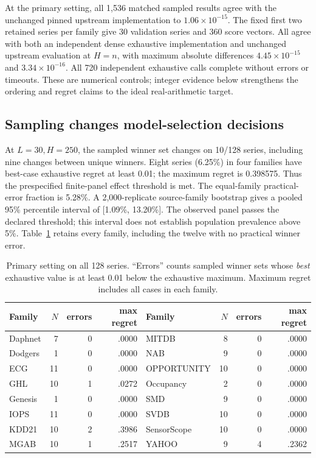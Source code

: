 At the primary setting, all 1,536 matched sampled results agree with the
unchanged pinned upstream implementation to $1.06\times10^{-15}$.
The fixed first two retained series per family give 30 validation series
and 360 score vectors. All agree with both an independent dense exhaustive
implementation and unchanged upstream evaluation at $H=n$, with maximum
absolute differences $4.45\times10^{-15}$ and $3.34\times10^{-16}$.
All 720 independent exhaustive calls complete without errors or timeouts.
These are numerical controls; integer evidence below strengthens the
ordering and regret claims to the ideal real-arithmetic target.

\subsection{Sampling changes model-selection decisions}
At $L=30,H=250$, the sampled winner set changes on 10/128 series, including
nine changes between unique winners. Eight series (6.25\%) in four
families have best-case exhaustive regret at least 0.01; the maximum
regret is 0.398575. Thus the prespecified finite-panel effect threshold
is met. The equal-family practical-error fraction is 5.28\%.
A 2,000-replicate source-family bootstrap gives a pooled 95\% percentile
interval of [1.09\%, 13.20\%]. The observed panel passes the declared
threshold; this interval does not establish population prevalence above
5\%. Table~\ref{tab:primary-families} retains every family, including the
twelve with no practical winner error.

\begin{table}[t]
\caption{Primary setting on all 128 series. ``Errors'' counts sampled
winner sets whose \emph{best} exhaustive value is at least 0.01 below the
exhaustive maximum. Maximum regret includes all cases in each family.}
\label{tab:primary-families}

\centering\small
\begin{tabular}{lrrr@{\qquad}lrrr}
\toprule
Family & $N$ & errors & max regret & Family & $N$ & errors & max regret\\
\midrule
Daphnet & 7 & 0 & .0000 & MITDB & 8 & 0 & .0000\\
Dodgers & 1 & 0 & .0000 & NAB & 9 & 0 & .0000\\
ECG & 11 & 0 & .0000 & OPPORTUNITY & 10 & 0 & .0000\\
GHL & 10 & 1 & .0272 & Occupancy & 2 & 0 & .0000\\
Genesis & 1 & 0 & .0000 & SMD & 9 & 0 & .0000\\
IOPS & 11 & 0 & .0000 & SVDB & 10 & 0 & .0000\\
KDD21 & 10 & 2 & .3986 & SensorScope & 10 & 0 & .0000\\
MGAB & 10 & 1 & .2517 & YAHOO & 9 & 4 & .2362\\
\bottomrule
\end{tabular}

\end{table}

